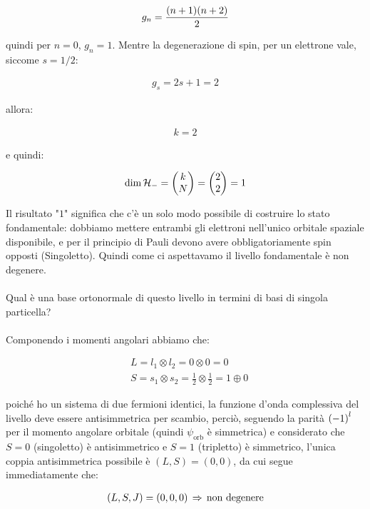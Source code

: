 \begin{itemize}
	\begin{align*}
		g_n = \frac{\qty(n+1)\qty(n+2)}{2}
	\end{align*}
	
		quindi per $n = 0$, $g_n = 1$. Mentre la degenerazione di spin, per un elettrone vale, siccome $s = 1/2$:
		
	\begin{align*}
		g_s = 2s + 1 = 2
	\end{align*}
	
		allora:
		
	\begin{align*}
		k = 2
	\end{align*}

		e quindi:
	
	\begin{align*}
		\text{dim} \, \mathcal{H}_- =\mqty(k \\ N) = \mqty(2 \\ 2) = 1
	\end{align*}
	
		Il risultato "$1$" significa che c'è un solo modo possibile di costruire lo stato fondamentale: dobbiamo mettere entrambi gli elettroni nell'unico orbitale spaziale disponibile, e per il principio di Pauli devono avere obbligatoriamente spin opposti (Singoletto). Quindi come ci aspettavamo il livello fondamentale è non degenere.
		\\
		\\
		Qual è una base ortonormale di questo livello in termini di basi di singola particella?
		\\
		\\
		Componendo i momenti angolari abbiamo che:
		
	\begin{align*}
		& L = l_1 \otimes l_2 = 0 \otimes 0 = 0 \\
		& S = s_1 \otimes s_2 = \frac{1}{2} \otimes \frac{1}{2} = 1 \oplus 0
	\end{align*}
	
		poiché ho un sistema di due fermioni identici, la funzione d'onda complessiva del livello deve essere antisimmetrica per scambio, perciò, seguendo la parità $\qty(-1)^l$ per il momento angolare orbitale (quindi $\psi_{\text{orb}}$ è simmetrica) e considerato che $S = 0$ (singoletto) è antisimmetrico e $S = 1$ (tripletto) è simmetrico, l'unica coppia antisimmetrica possibile è $(L,S) = (0,0)$, da cui segue immediatamente che:
		
	\begin{align*}
		\qty(L, S, J) = \qty(0, 0, 0) \, \Rightarrow \, \text{non degenere}
	\end{align*}
	

\end{itemize}
